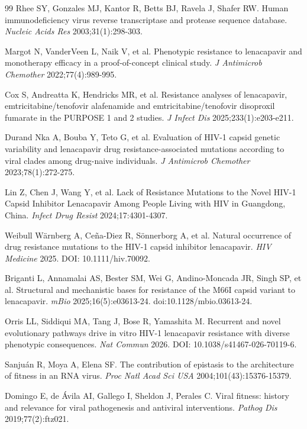 \documentclass[12pt,a4paper]{article}
\begin{document}
\begin{thebibliography}{99}
 Rhee SY, Gonzales MJ, Kantor R, Betts BJ, Ravela J, Shafer RW. Human immunodeficiency virus reverse transcriptase and protease sequence database. \textit{Nucleic Acids Res} 2003;31(1):298-303.

 Margot N, VanderVeen L, Naik V, et al. Phenotypic resistance to lenacapavir and monotherapy efficacy in a proof-of-concept clinical study. \textit{J Antimicrob Chemother} 2022;77(4):989-995.

 Cox S, Andreatta K, Hendricks MR, et al. Resistance analyses of lenacapavir, emtricitabine/tenofovir alafenamide and emtricitabine/tenofovir disoproxil fumarate in the PURPOSE 1 and 2 studies. \textit{J Infect Dis} 2025;233(1):e203-e211.

 Durand Nka A, Bouba Y, Teto G, et al. Evaluation of HIV-1 capsid genetic variability and lenacapavir drug resistance-associated mutations according to viral clades among drug-naive individuals. \textit{J Antimicrob Chemother} 2023;78(1):272-275.

 Lin Z, Chen J, Wang Y, et al. Lack of Resistance Mutations to the Novel HIV-1 Capsid Inhibitor Lenacapavir Among People Living with HIV in Guangdong, China. \textit{Infect Drug Resist} 2024;17:4301-4307.

 Weibull W\"arnberg A, Ce\~na-Diez R, S\"onnerborg A, et al. Natural occurrence of drug resistance mutations to the HIV-1 capsid inhibitor lenacapavir. \textit{HIV Medicine} 2025. DOI: 10.1111/hiv.70092.

 Briganti L, Annamalai AS, Bester SM, Wei G, Andino-Moncada JR, Singh SP, et al. Structural and mechanistic bases for resistance of the M66I capsid variant to lenacapavir. \textit{mBio} 2025;16(5):e03613-24. doi:10.1128/mbio.03613-24.

 Orris LL, Siddiqui MA, Tang J, Bose R, Yamashita M. Recurrent and novel evolutionary pathways drive in vitro HIV-1 lenacapavir resistance with diverse phenotypic consequences. \textit{Nat Commun} 2026. DOI: 10.1038/s41467-026-70119-6.

 Sanju\'an R, Moya A, Elena SF. The contribution of epistasis to the architecture of fitness in an RNA virus. \textit{Proc Natl Acad Sci USA} 2004;101(43):15376-15379.

 Domingo E, de Ávila AI, Gallego I, Sheldon J, Perales C. Viral fitness: history and relevance for viral pathogenesis and antiviral interventions. \textit{Pathog Dis} 2019;77(2):ftz021.

\end{thebibliography}
\end{document}
